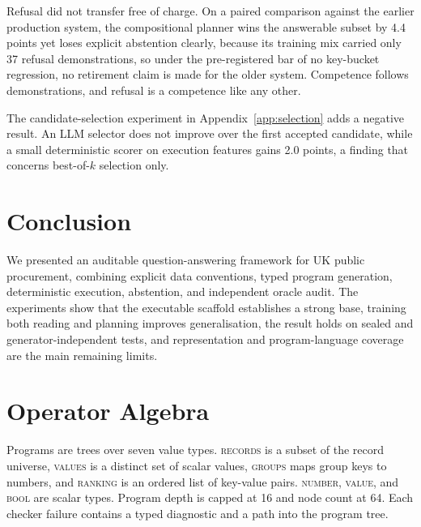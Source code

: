 \documentclass{article}
\begin{document}
Refusal did not transfer free of charge. On a paired comparison against
the earlier production system, the compositional planner wins the
answerable subset by 4.4 points yet loses explicit abstention clearly,
because its training mix carried only 37 refusal demonstrations, so under
the pre-registered bar of no key-bucket regression, no retirement claim is
made for the older system. Competence follows demonstrations, and refusal
is a competence like any other.

The candidate-selection experiment in Appendix~\ref{app:selection} adds a
negative result. An LLM selector does not improve over the first accepted
candidate, while a small deterministic scorer on execution features gains
2.0 points, a finding that concerns best-of-$k$ selection only.

\section{Conclusion}
\label{sec:conclusion}

We presented an auditable question-answering framework for UK public
procurement, combining explicit data conventions, typed program generation,
deterministic execution, abstention, and independent oracle audit. The
experiments show that the executable scaffold establishes a strong base,
training both reading and planning improves generalisation, the result
holds on sealed and generator-independent tests, and representation and
program-language coverage are the main remaining limits.




\appendix

\section{Operator Algebra}
\label{app:algebra}

Programs are trees over seven value types. \textsc{records} is a subset of the
record universe, \textsc{values} is a distinct set of scalar values,
\textsc{groups} maps group keys to numbers, and \textsc{ranking} is an ordered
list of key-value pairs. \textsc{number}, \textsc{value}, and \textsc{bool}
are scalar types. Program depth is capped at 16 and node count at 64. Each
checker failure contains a typed diagnostic and a path into the program tree.
\end{document}

